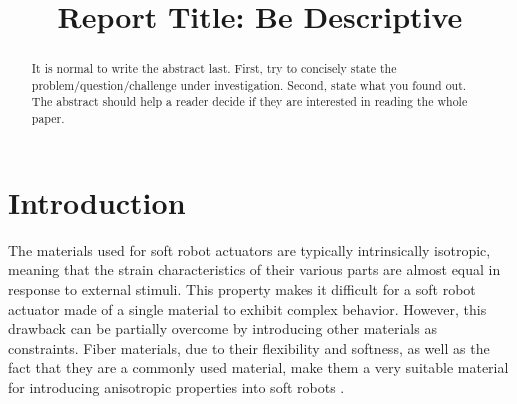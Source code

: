 \documentclass[conference]{IEEEtran}
\begin{document}
\title{Report Title: Be Descriptive}

\author{
    \and
}

\maketitle

\begin{abstract}
It is normal to write the abstract last.  First, try to concisely state the problem/question/challenge under investigation.  Second, state what you found out.  The abstract should help a reader decide if they are interested in reading the whole paper.  
\end{abstract}

% 

\section{Introduction}

The materials used for soft robot actuators are typically intrinsically isotropic, meaning that the strain characteristics of their various parts are almost equal in response to external stimuli. This property makes it difficult for a soft robot actuator made of a single material to exhibit complex behavior. However, this drawback can be partially overcome by introducing other materials as constraints. Fiber materials, due to their flexibility and softness, as well as the fact that they are a commonly used material, make them a very suitable material for introducing anisotropic properties into soft robots \cite{overview}.
\end{document}
